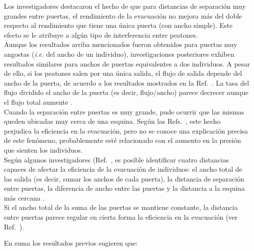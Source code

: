 \noindent Los investigadores destacaron el hecho de que para distancias de separación muy grandes entre puertas, el rendimiento de la evacuación no mejora más del doble respecto al rendimiento que tiene una única puerta (con ancho simple). Este efecto se le atribuye a algún tipo de interferencia entre peatones\cite{perez1}.\\

\noindent Aunque los resultados arriba mencionados fueron obtenidos para puertas muy angostas (\emph{i.e.} del ancho de un individuo),
investigaciones posteriores exhiben resultados similares para anchos de puertas equivalentes a dos individuos. A pesar de ello, si los peatones salen por una única salida, el flujo de salida depende del ancho de la puerta, de acuerdo a los resultados mostrados en la Ref.~\cite{daoliang1}. La tasa del flujo dividido el ancho de la puerta (es decir, flujo/ancho) parece decrecer aunque el flujo total aumente \cite{daoliang1}.\\
 
Cuando la separación entre puertas es muy grande, pude ocurrir que las mismas queden ubicadas muy cerca de una esquina. Según las 
Refs.~\cite{kirchner1,daoliang1}, este hecho perjudica la eficiencia 
en la evacuación, pero no se conoce una explicación precisa de este 
fenómeno, probablemente esté relacionado con el aumento en la presión que sienten los individuos. \\

\noindent Según algunos investigadores (Ref.~\cite{huanhuan1}, es posible identificar cuatro distancias capaces de afectar la eficiencia de la evacuación de individuos: el ancho total de las salida (es decir, sumar los anchos de cada puerta), la distancia de separación entre puertas, la diferencia de ancho entre las puertas y la distancia a la esquina más cercana \cite{huanhuan1}. \\

Si el ancho total de la suma de las puertas se mantiene constante, la distancia entre puertas parece regular en cierta forma la eficiencia en la evacuación (ver Ref.~\cite{huanhuan1}).


En suma los resultados previos sugieren que:

